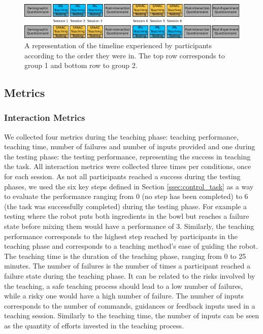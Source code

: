 \begin{figure}[ht]
	\centering
	\includegraphics[width=1\textwidth]{protocol.pdf}
	\caption{A representation of the timeline experienced by participants according to the order they were in. The top row corresponds to group 1 and bottom row to group 2.}
	\label{fig:control_design}
\end{figure}

\subsection{Metrics}

\subsubsection{Interaction Metrics}

We collected four metrics during the teaching phase: teaching performance, teaching time, number of failures and number of inputs provided and one during the testing phase: the testing performance, representing the success in teaching the task. All interaction metrics were collected three times per conditions, once for each session. As not all participants reached a success during the testing phases, we used the six key steps defined in Section \ref{ssec:control_task} as a way to evaluate the performance ranging from 0 (no step has been completed) to 6 (the task was successfully completed) during the testing phase. For example a testing where the robot puts both ingredients in the bowl but reaches a failure state before mixing them would have a performance of 3. Similarly, the teaching performance corresponds to the highest step reached by participants in the teaching phase and corresponds to a teaching method's ease of guiding the robot. The teaching time is the duration of the teaching phase, ranging from 0 to 25 minutes. The number of failures is the number of times a participant reached a failure state during the teaching phase. It can be related to the risks involved by the teaching, a safe teaching process should lead to a low number of failures, while a risky one would have a high number of failure. The number of inputs corresponds to the number of commands, guidances or feedback inputs used in a teaching session. Similarly to the teaching time, the number of inputs can be seen as the quantity of efforts invested in the teaching process.

